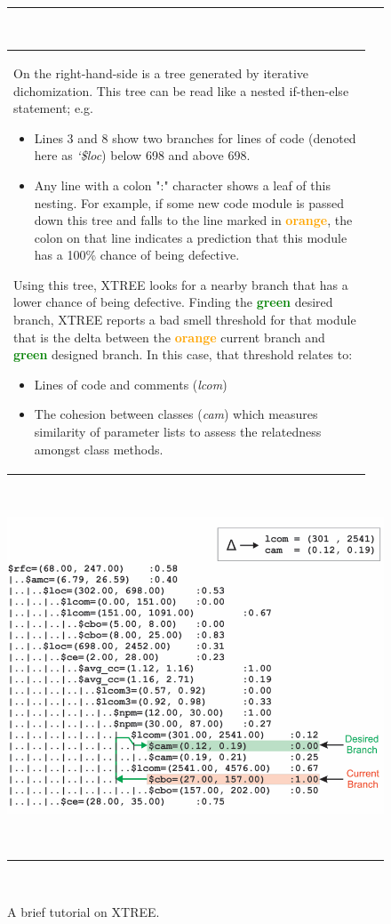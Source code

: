 \documentclass{sig-alternate}
\begin{document}
\begin{figure}[!b]
~\hrule~
\begin{minipage}{.53\linewidth}
\small
 \begin{tabular}{p{0.95\linewidth}} 
 On the right-hand-side is a tree
 generated by iterative dichomization. 
 This tree can be read like a nested if-then-else statement; e.g.
 \begin{itemize}
     \item Lines 3 and 8 show two branches for lines of code (denoted here as {\em `\$loc}) below 698 and above 698.
     \item Any line with a colon ":" character shows  a  leaf  of  this  nesting.   For  example,  if  some  new  code module is passed down this tree and falls to the line marked in \textcolor{orange}{{\bf orange}},  the colon on that line indicates a prediction that this module has a 100\% chance of being defective. 
     \end{itemize}
Using this tree,
 XTREE looks for a nearby branch that has a lower chance of being defective. Finding the \textcolor{green}{{\bf green}} desired  branch,  XTREE reports a bad smell threshold for that module that is the delta between the \textcolor{orange}{{\bf orange}}  current branch  and   \textcolor{green}{{\bf green}} designed branch. 
 In this case, that threshold relates to:
 \begin{itemize}
     \item Lines of code and comments ({\em lcom}) 
     \item The cohesion between classes ({\em cam}) which measures similarity of parameter lists to assess the relatedness amongst class   methods.
     \end{itemize}\\ 
 \end{tabular}
 \end{minipage}~~~~
 \begin{minipage}{.45\linewidth}
\includegraphics[width=\linewidth]{figs/XTREE_samp.png}
\end{minipage}
~\hrule~
 \caption{A brief tutorial on XTREE.} \label{fig:xtree_samp}
\end{figure}
\end{document}
